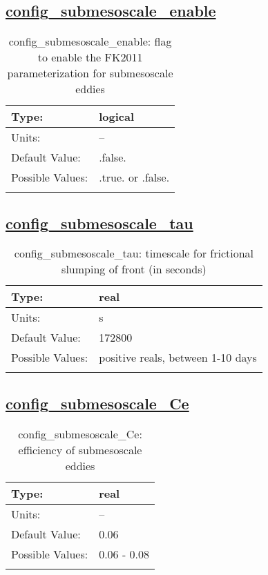 \subsection[config\_submesoscale\_enable]{\hyperref[sec:nm_tab_submesoscale_eddy_parameterization]{config\_submesoscale\_enable}}
\label{subsec:nm_sec_config_submesoscale_enable}
\begin{center}
\begin{longtable}{| p{2.0in} || p{4.0in} |}
    \hline
    Type: & logical \\
    \hline
    Units: & -- \\
    \hline
    Default Value: & .false. \\
    \hline
    Possible Values: & .true. or .false. \\
    \hline
    \caption{config\_submesoscale\_enable: flag to enable the FK2011 parameterization for submesoscale eddies}
\end{longtable}
\end{center}
\subsection[config\_submesoscale\_tau]{\hyperref[sec:nm_tab_submesoscale_eddy_parameterization]{config\_submesoscale\_tau}}
\label{subsec:nm_sec_config_submesoscale_tau}
\begin{center}
\begin{longtable}{| p{2.0in} || p{4.0in} |}
    \hline
    Type: & real \\
    \hline
    Units: & \si{s} \\
    \hline
    Default Value: & 172800 \\
    \hline
    Possible Values: & positive reals, between 1-10 days \\
    \hline
    \caption{config\_submesoscale\_tau: timescale for frictional slumping of front (in seconds)}
\end{longtable}
\end{center}
\subsection[config\_submesoscale\_Ce]{\hyperref[sec:nm_tab_submesoscale_eddy_parameterization]{config\_submesoscale\_Ce}}
\label{subsec:nm_sec_config_submesoscale_Ce}
\begin{center}
\begin{longtable}{| p{2.0in} || p{4.0in} |}
    \hline
    Type: & real \\
    \hline
    Units: & -- \\
    \hline
    Default Value: & 0.06 \\
    \hline
    Possible Values: & 0.06 - 0.08 \\
    \hline
    \caption{config\_submesoscale\_Ce: efficiency of submesoscale eddies}
\end{longtable}
\end{center}
